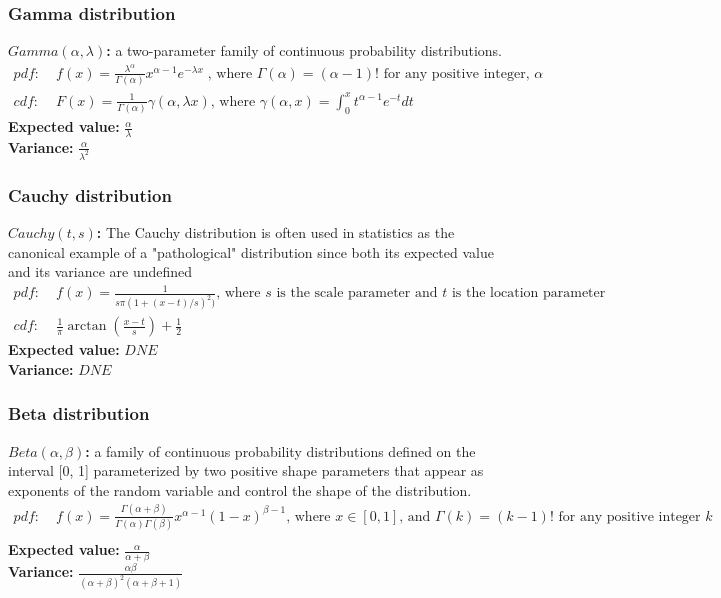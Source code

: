 \documentclass{article}
\begin{document}
\subsubsection{Gamma distribution}
\textbf{$Gamma(\alpha, \lambda)$:} a two-parameter family of continuous probability distributions.
\begin{align*}
    pdf: & \; f(x) = \frac{\lambda^{\alpha}}{\Gamma(\alpha)}x^{\alpha-1} e^{-\lambda x} \; \textrm{, where } \Gamma(\alpha) = (\alpha - 1)! \textrm{ for any positive integer, } \alpha\\
    cdf: & \; F(x) =  \frac{1}{\Gamma(\alpha)}\gamma(\alpha, \lambda x) \textrm{, where } \gamma(\alpha, x) = \int_0^x t^{\alpha - 1}e^{-t}dt
\end{align*}
\textbf{Expected value:} $\frac{\alpha}{\lambda}$\\
\textbf{Variance:} $\frac{\alpha}{\lambda^2}$

\subsubsection{Cauchy distribution}
\textbf{$Cauchy(t, s)$:} The Cauchy distribution is often used in statistics as the canonical example of a "pathological" distribution since both its expected value and its variance are undefined
\begin{align*}
    pdf: & \; f(x) = \frac{1}{s \pi (1 + (x - t)/s)^2)} \textrm{, where } s \textrm{ is the scale parameter and } t \textrm{ is the location parameter}\\
    cdf: & \; \frac{1}{\pi} \arctan \left ( \frac{x - t}{s} \right ) + \frac{1}{2}
\end{align*}
\textbf{Expected value:} $DNE$\\
\textbf{Variance:} $DNE$

\subsubsection{Beta distribution}
\textbf{$Beta(\alpha, \beta)$:} a family of continuous probability distributions defined on the interval [0, 1] parameterized by two positive shape parameters that appear as exponents of the random variable and control the shape of the distribution.
\begin{align*}
    pdf: & \; f(x) = \frac{\Gamma(\alpha + \beta)}{\Gamma(\alpha) \Gamma(\beta)} x^{\alpha - 1} (1-x)^{\beta - 1} \textrm{, where } x \in [0, 1] \textrm{, and } \Gamma(k) = (k - 1)! \textrm{ for any positive integer } k\\
\end{align*}
\textbf{Expected value:} $\frac{\alpha}{\alpha + \beta}$\\
\textbf{Variance:} $\frac{\alpha \beta}{(\alpha + \beta)^2(\alpha + \beta + 1)}$
\end{document}
